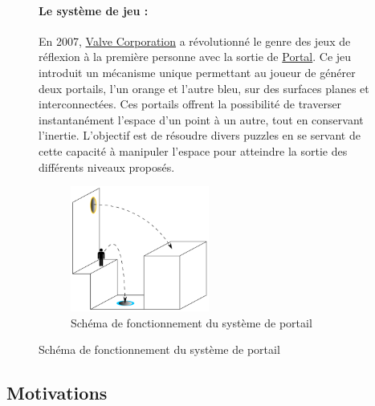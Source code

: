 \documentclass[12pt]{report}
\begin{document}






\begin{figure}[H]
	\paragraph{Le système de jeu : }
	En 2007, \href{https://fr.wikipedia.org/wiki/Valve_Corporation}{Valve Corporation} a révolutionné le genre des jeux 
	de réflexion à la première personne avec la sortie de 
	\href{https://fr.wikipedia.org/wiki/Portal_(jeu_vid%C3%A9o)}{Portal}. Ce jeu introduit un mécanisme unique 
	permettant au joueur de générer deux portails, l'un orange et l'autre bleu, sur des surfaces planes et 
	interconnectées. Ces portails offrent la possibilité de traverser instantanément l'espace d'un point à un autre, 
	tout en conservant l'inertie. L'objectif est de résoudre divers puzzles en se servant de cette capacité à manipuler 
	l'espace pour atteindre la sortie des différents niveaux proposés.
	\begin{figure}[H]
		\centering
		\includegraphics[width=0.5\textwidth]{image/schema_portal.png}
		\caption{Schéma de fonctionnement du système de portail}
		\label{fig:schema_portal}
	\end{figure}
\end{figure}
\clearpage

\subsection{Motivations}

\paragraph{}
\end{document}
